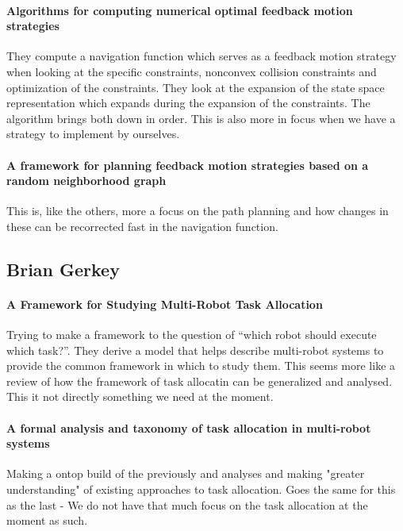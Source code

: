 \paragraph{Algorithms for computing numerical optimal feedback motion strategies}
They compute a navigation function which serves as a feedback motion strategy when looking at the specific constraints, nonconvex collision constraints and optimization of the constraints. They look at the expansion of the state space representation which expands during the expansion of the constraints. The algorithm brings both down in order.
This is also more in focus when we have a strategy to implement by ourselves.

{\vskip0pt\color{gray}
\paragraph{A framework for planning feedback motion strategies based on a random neighborhood graph}
This is, like the others, more a focus on the path planning and how changes in these can be recorrected fast in the navigation function.}


\subsection{Brian Gerkey}

{\vskip0pt\color{gray}
\paragraph{A Framework for Studying Multi-Robot Task Allocation}
Trying to make a framework to the question of “which robot should execute which task?”. They derive a model that helps describe multi-robot systems to provide the common framework in which to study them.
This seems more like a review of how the framework of task allocatin can be generalized and analysed. This it not directly something we need at the moment.}

{\vskip0pt\color{gray}
\paragraph{A formal analysis and taxonomy of task allocation in multi-robot systems}
Making a ontop build of the previously and analyses and making "greater understanding" of existing approaches to task allocation.
Goes the same for this as the last - We do not have that much focus on the task allocation at the moment as such.}

